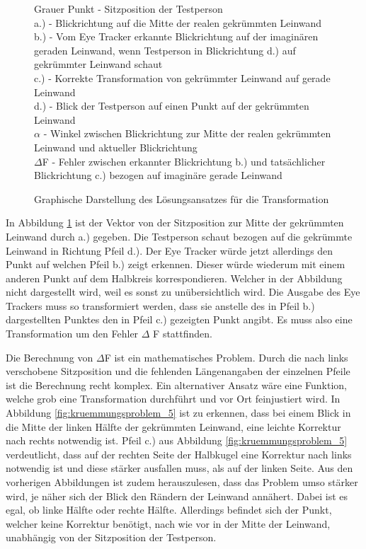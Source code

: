 \begin{figure}
\begin{center}
\begin{tikzpicture}
		\end{tikzpicture}
		\caption[]{Graphische Darstellung des Lösungsansatzes für die Transformation}
		\captionsetup{justification=justified, singlelinecheck=false}
		{\footnotesize Grauer Punkt - Sitzposition der Testperson\\
		a.) - Blickrichtung auf die Mitte der realen gekrümmten Leinwand\\
		b.) - Vom Eye Tracker erkannte Blickrichtung auf der imaginären geraden Leinwand, wenn Testperson in Blickrichtung d.) auf gekrümmter Leinwand schaut\\
		c.) - Korrekte Transformation von gekrümmter Leinwand auf gerade Leinwand\\
		d.) - Blick der Testperson auf einen Punkt auf der gekrümmten Leinwand\\
		$\alpha$ - Winkel zwischen Blickrichtung zur Mitte der realen gekrümmten Leinwand und aktueller Blickrichtung\\
		$\Delta$F - Fehler zwischen erkannter Blickrichtung b.) und tatsächlicher Blickrichtung c.) bezogen auf imaginäre gerade Leinwand
		} \label{fig:kruemmungsproblem_4}
	\end{center}
\end{figure}

In Abbildung \ref{fig:kruemmungsproblem_4} ist der Vektor von der Sitzposition zur Mitte der gekrümmten Leinwand durch a.) gegeben. Die Testperson schaut bezogen auf die gekrümmte Leinwand in Richtung Pfeil d.). Der Eye Tracker würde jetzt allerdings den Punkt auf welchen Pfeil b.) zeigt erkennen. Dieser würde wiederum mit einem anderen Punkt auf dem Halbkreis korrespondieren. Welcher in der Abbildung nicht dargestellt wird, weil es sonst zu unübersichtlich wird. Die Ausgabe des Eye Trackers muss so transformiert werden, dass sie anstelle des in Pfeil b.) dargestellten Punktes den in Pfeil c.) gezeigten Punkt angibt. Es muss also eine Transformation um den Fehler $\Delta$ F stattfinden.


Die Berechnung von $\Delta$F ist ein mathematisches Problem. Durch die nach links verschobene Sitzposition und die fehlenden Längenangaben der einzelnen Pfeile ist die Berechnung recht komplex. Ein alternativer Ansatz wäre eine Funktion, welche grob eine Transformation durchführt und vor Ort feinjustiert wird. In Abbildung \ref{fig:kruemmungsproblem_5} ist zu erkennen, dass bei einem Blick in die Mitte der linken Hälfte der gekrümmten Leinwand, eine leichte Korrektur nach rechts notwendig ist. Pfeil c.) aus Abbildung \ref{fig:kruemmungsproblem_5} verdeutlicht, dass auf der rechten Seite der Halbkugel eine Korrektur nach links notwendig ist und diese stärker ausfallen muss, als auf der linken Seite. Aus den vorherigen Abbildungen ist zudem herauszulesen, dass das Problem umso stärker wird, je näher sich der Blick den Rändern der Leinwand annähert. Dabei ist es egal, ob linke Hälfte oder rechte Hälfte. 
Allerdings befindet sich der Punkt, welcher keine Korrektur benötigt, nach wie vor in der Mitte der Leinwand, unabhängig von der Sitzposition der Testperson.

